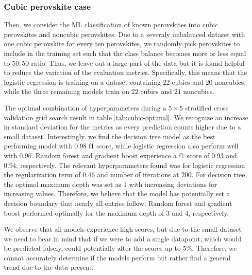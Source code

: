 \subsubsection{Cubic perovskite case}


Then, we consider the ML classification of known perovskites into cubic perovskites and noncubic perovskites. Due to a severaly imbalanced dataset with one cubic perovskite for every ten perovskites, we randomly pick perovskites to include in the training set such that the class balance becomes more or less equal to $50:50$ ratio. Thus, we leave out a large part of the data but it is found helpful to reduce the variation of the evaluation metrics. Specifically, this means that the logistic regression is training on a dataset containing $22$ cubics and $20$ noncubics, while the three remaining models train on $22$ cubics and $21$ noncubics.

The optimal combination of hyperparameters during a $5\times 5$ stratified cross validation grid search result in table \autoref{tab:cubic-optimal}. We recognize an increase in standard deviation for the metrics as every prediction counts higher due to a small dataset. Interestingly, we find the decision tree model as the best performing model with $0.98$ f1 score, while logistic regression also perform well with $0.96$. Random forest and gradient boost experience a f1 score of $0.93$ and $0.94$, respectively. The relevant hyperparameters found was for logistic regression the regularization term of $0.46$ and number of iterations at $200$. For decision tree, the optimal maximum depth was set as $1$ with increasing deviations for increasing values. Therefore, we believe that the model has potentially set a decision boundary that nearly all entries follow. Random forest and gradient boost performed optimally for the maximum depth of $3$ and $4$, respectively.

We observe that all models experience high scores, but due to the small dataset we need to bear in mind that if we were to add a single datapoint, which would be predicted falsely, could potentially alter the scores up to $5\%$. Therefore, we cannot accurately determine if the models perform but rather find a general trend due to the data present.


